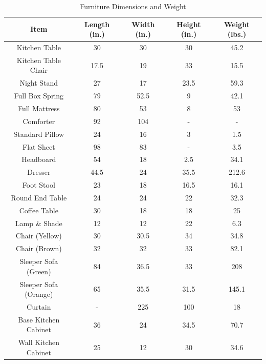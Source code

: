\documentclass{article}
\begin{document}
\renewcommand{\arraystretch}{1.5}
\begin{table}[H]
	\centering
	\caption{Furniture Dimensions and Weight}
		\begin{tabular}[c]{|c|c|c|c|c|}
			\hline
			\textbf{Item} & \textbf{Length (in.)} & \textbf{Width (in.)} & \textbf{Height (in.)} & \textbf{Weight (lbs.)} \\ \hline \hline
			Kitchen Table & 30 & 30 & 30 & 45.2 \\ \hline
			Kitchen Table Chair & 17.5 & 19 & 33 & 15.5 \\ \hline
			Night Stand & 27 & 17 & 23.5 & 59.3 \\ \hline
			Full Box Spring & 79 & 52.5 & 9 & 42.1 \\ \hline
			Full Mattress & 80 & 53 & 8 & 53 \\ \hline
			Comforter & 92 & 104 & - & - \\ \hline
			Standard Pillow & 24 & 16 & 3 & 1.5 \\ \hline
			Flat Sheet & 98 & 83 & - & 3.5 \\ \hline
			Headboard & 54 & 18 & 2.5 & 34.1 \\ \hline
			Dresser & 44.5 & 24 & 35.5 & 212.6 \\ \hline
			Foot Stool & 23 & 18 & 16.5 & 16.1 \\ \hline
			Round End Table & 24 & 24 & 22 & 32.3 \\ \hline
			Coffee Table & 30 & 18 & 18 & 25 \\ \hline
			Lamp \& Shade & 12 & 12 & 22 & 6.3 \\ \hline
			Chair (Yellow) & 30 & 30.5 & 34 & 34.8 \\ \hline
			Chair (Brown) & 32 & 32 & 33 & 82.1 \\ \hline
			Sleeper Sofa (Green) & 84 & 36.5 & 33 & 208 \\ \hline
			Sleeper Sofa (Orange) & 65 &35.5 & 31.5 & 145.1 \\ \hline
			Curtain & - & 225 & 100 & 18 \\ \hline	
			Base Kitchen Cabinet & 36 & 24 & 34.5 & 70.7 \\ \hline
			Wall Kitchen Cabinet & 25 & 12 & 30 & 34.6 \\ \hline
		\end{tabular}
	\label{FurnitureTable}
\end{table}
\end{document}
